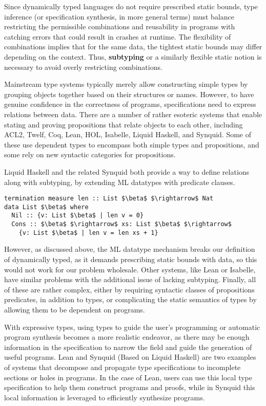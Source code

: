 \documentclass[sigplan,screen]{acmart}
\begin{document}
Since dynamically typed languages do not require prescribed static bounds, 
type inference (or specification synthesis, in more general terms) must balance 
restricting the permissible combinations and reusability in programs with 
catching errors that could result in crashes at runtime.
The flexibility of combinations implies that for the same data, 
the tightest static bounds may differ depending on the context.
Thus, \textbf{subtyping} or a similarly flexible 
static notion is necessary to avoid overly restricting combinations.

Mainstream type systems typically merely allow constructing simple types 
by grouping objects together based on their structures or names.
However, to have genuine confidence in the correctness of programs, specifications
need to express relations between data. There are a number of rather esoteric systems that
enable stating and proving propositions that relate objects to each other, 
including ACL2, Twelf, Coq, Lean, HOL, Isabelle, Liquid Haskell, and Synquid.  
Some of these use dependent types to encompass both simple types and propositions, 
and some rely on new syntactic categories for propositions. 

Liquid Haskell and the related Synquid both provide a way to define relations
along with subtyping, by extending ML datatypes with predicate clauses. 

\begin{lstlisting}[keywords={termination, measure, data, where}]
termination measure len :: List $\beta$ $\rightarrow$ Nat 
data List $\beta$ where
  Nil :: {v: List $\beta$ | len v = 0}
  Cons :: $\beta$ $\rightarrow$ xs: List $\beta$ $\rightarrow$ 
    {v: List $\beta$ | len v = len xs + 1}

\end{lstlisting}

However, as discussed above, the ML datatype mechanism breaks our definition of dynamically typed,
as it demands prescribing static bounds with data, so this would not work for our problem wholesale.
Other systems, like Lean or Isabelle, have similar problems with the additional issue of lacking subtyping.
Finally, all of these are rather complex, either by requiring syntactic classes of propositions predicates, 
in addition to types, or complicating the static semantics of types by allowing them 
to be dependent on programs.



With expressive types, using types to guide the user's programming or automatic program synthesis 
becomes a more realistic endeavor, as there may be enough information in the specification to narrow the field
and guide the generation of useful programs. Lean and Synquid\cite{} (Based on Liquid Haskell) 
are two examples of systems that decompose and propagate type specifications 
to incomplete sections or holes in programs. 
In the case of Lean, users can use this local type specification to help them construct programs and proofs,
while in Synquid this local information is leveraged to efficiently synthesize programs. 
\end{document}
